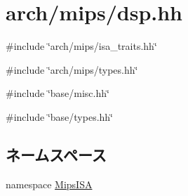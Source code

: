 \hypertarget{mips_2dsp_8hh}{
\section{arch/mips/dsp.hh}
\label{mips_2dsp_8hh}
}
{\ttfamily \#include \char`\"{}arch/mips/isa\_\-traits.hh\char`\"{}}\par
{\ttfamily \#include \char`\"{}arch/mips/types.hh\char`\"{}}\par
{\ttfamily \#include \char`\"{}base/misc.hh\char`\"{}}\par
{\ttfamily \#include \char`\"{}base/types.hh\char`\"{}}\par
\subsection*{ネームスペース}
\begin{DoxyCompactItemize}
\item 
namespace \hyperlink{namespaceMipsISA}{MipsISA}
\end{DoxyCompactItemize}
